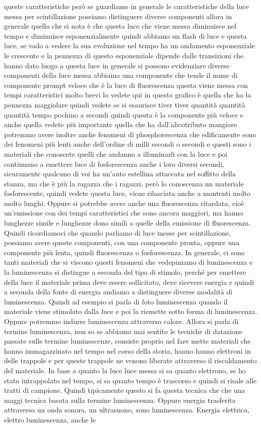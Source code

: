 queste caratteristiche però se guardiamo in generale le caratteristiche della luce messa per scintillazione possiamo distinguere diverse componenti allora in generale quello che si nota è che questa luce che viene messa diminuisce nel tempo e diminuisce esponenzialmente quindi abbiamo un flash di luce e questa luce, se vado a vedere la sua evoluzione nel tempo ha un andamento esponenziale le crescente e la pennezza di questo esponenziale dipende dalle transizioni che hanno dato luogo a questa luce in generale si possono evidenziare diverse componenti della luce messa abbiamo una componente che tende il nome di componente prompt veloce che è la luce di fluorescenza questa viene messa con tempi caratteristici molto brevi lo vedete qui in questo grafico è quella che ha la pennezza maggiolare quindi vedete se si esaurisce tiver tiver quantità quantità quantità tempo pochino a secondi quindi questa è la componente più veloce e anche quella vedete più importante quella che ha dall'alicotributo mangiore potremmo avere inoltre anche fenomeni di phosphorescenza che edificamente sono dei fenomeni più lenti anche dell'ordine di milli secondi o secondi e questi sono i materiali che conoscete quelli che andanno a illuminarli con la luce e poi continuano a emettere luce di fosforescenza anche i loro diversi secondi, sicuramente qualcuno di voi ha un'auto estellina attaccata nel soffitto della stanza, ma che è più la ragazza che i ragazzi, però lo conoscenza un materiale fosforescente, quindi vedete questa luce, viene rilasciata anche a montenti molto molto lunghi. Oppure si potrebbe avere anche una fluorescenza ritardata, cioè un'emissione con dei tempi caratteristici che sono ancora maggiori, ma hanno lunghezze simile e lunghezze dono simili a quelle della emissione di fluorescenza. Quindi ricordiamoci che quando parliamo di luce messe per scintillazione, possiamo avere queste componenti, con una componente pronta, oppure una componente più lenta, quindi fluorescenza o fosforescenza. In generale, ci sono tanti materiali che si viscono questi fenomeni che vedepiniamo di luminescenza e la luminescenza si distingue a seconda del tipo di stimolo, perché per emettere della luce il materiale prima deve essere sollicitato, deve ricevere energia e quindi a seconda della fonte di energia andiamo a distinguere diverse modalità di luminescenza. Quindi ad esempio si parla di foto luminescenza quando il materiale viene stimolato dalla luce e poi la riemette sotto forma di luminescenza. Oppure potremmo indurre luminescenza attraverso calore. Allora si parla di termine luminescenza, non so se abbiamo mai sentito le tecniche di datazione passate sulle termine luminescenze, consiste proprio nel fare mette materiali che hanno immagazzinato nel tempo nel corso della storia, hanno hanno elettroni in delle trappole e per queste trappole ne venono liberate attraverso il riscaldamento del materiale. In base a quanto la luce luce messa si sa quanto elettrono, se ho stato intrappolato nel tempo, si sa quanto tempo è trascorso e quindi si risale alle tratti di campione. Quindi tipicamente questo si fa questa tecnica che che una maggi tecnica basata sulla termine luminescenza. Oppure energia trasferita attraverso un onda sonora, un ultrasuono, sono luminescenza. Energia elettrica, elettro luminescenza, anche le 